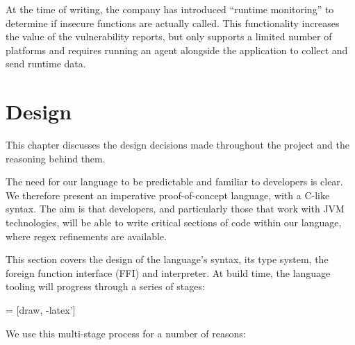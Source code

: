 \documentclass[a4paper,openany,12pt]{book}
\begin{document}
At the time of writing, the company has introduced ``runtime monitoring'' to determine if insecure functions are
actually called.
This functionality increases the value of the vulnerability reports, but only supports a limited number of platforms and
requires running an agent alongside the application to collect and send runtime data.

\chapter{Design}

This chapter discusses the design decisions made throughout the project and the reasoning behind them.

The need for our language to be predictable and familiar to developers is clear.
We therefore present an imperative proof-of-concept language, with a C-like syntax.
The aim is that developers, and particularly those that work with JVM technologies, will be able to write critical
sections of code within our language, where regex refinements are available.

This section covers the design of the language's syntax, its type system, the foreign function interface (FFI) and
interpreter.
At build time, the language tooling will progress through a series of stages:

 = [draw, -latex']


We use this multi-stage process for a number of reasons:
\end{document}
